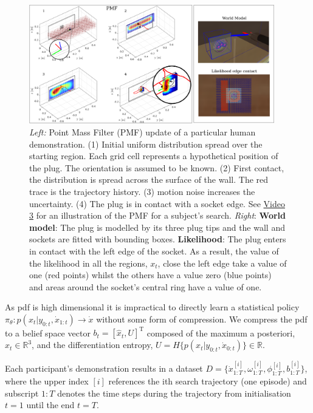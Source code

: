 \documentclass[final,5p,times,twocolumn]{elsarticle}
\begin{document}
\begin{figure}
 \centering
   \includegraphics[width=0.95\textwidth]{./Figure/Figure2.pdf}
   \caption{\textit{Left:} Point Mass Filter (PMF) update of a particular human demonstration. (1) Initial uniform distribution spread over the starting 
   region. Each grid cell represents a hypothetical position of the plug. The orientation is assumed to be known. (2) First contact, the distribution 
   is spread across the surface of the wall. The red trace is the trajectory history. (3) motion noise increases the uncertainty. (4) The plug is in contact with a socket edge.
   See \href{http://lasa.epfl.ch/videos/gpldecha/pih-search/subject_PMF_belief_location.wmv}{Video 3} for an illustration of the PMF for a subject's search.
   \textit{Right}: \textbf{World model}: The plug is modelled by its three plug tips and the wall and sockets are fitted with bounding boxes.
   \textbf{Likelihood}: The plug enters in contact with the left edge of the socket. As a result, the value of the likelihood in all the regions, $x_t$, close the left edge take 
   a value of one (red points)  whilst the others have a value zero (blue points) and areas around the socket's central 
   ring have a value of one. }
  \label{fig:PMF}
\end{figure}

As pdf is high dimensional it is impractical to directly learn a statistical 
policy ${\pi_{\theta} : p(x_t|y_{0:t},\dot{x}_{1:t}) \rightarrow \dot{x} }$ without some form of compression. 
We compress the pdf to a belief space vector $b_t = [\hat{x}_t,U]^{\mathrm{T}}$ composed of the maximum a posteriori, 
$\hat{x}_t \in \mathbb{R}^3$, and the differentiation entropy, $U = H\{p(x_t|y_{0:t},\dot{x}_{0:t})\} \in \mathbb{R}$.

Each participant's demonstration results in a dataset ${D=\{\dot{x}^{[i]}_{1:T},\omega^{[i]}_{1:T},\phi^{[i]}_{1:T},b^{[i]}_{1:T}\}}$, 
where the upper index $[i]$ references the ith search trajectory (one episode) and 
subscript $1:T$ denotes the time steps during the trajectory from initialisation $t=1$ until the end $t=T$. 
\end{document}
